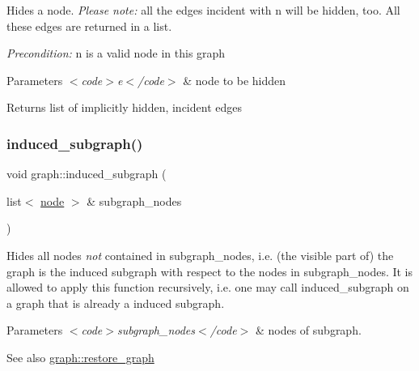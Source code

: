 Hides a node. {\itshape Please note\+:} all the edges incident with {\ttfamily n} will be hidden, too. All these edges are returned in a list.

{\itshape Precondition\+:} {\ttfamily n} is a valid node in this graph


\begin{DoxyParams}{Parameters}
{\em $<$code$>$e$<$/code$>$} & node to be hidden \\
\hline
\end{DoxyParams}
\begin{DoxyReturn}{Returns}
list of implicitly hidden, incident edges 
\end{DoxyReturn}
\mbox{\label{classgraph_ad185dbb16a66777632eb13eec3c54244}} 
\subsubsection{\texorpdfstring{induced\+\_\+subgraph()}{induced\_subgraph()}}
{\footnotesize\ttfamily void graph\+::induced\+\_\+subgraph (\begin{DoxyParamCaption}\item[{list$<$ \mbox{\hyperlink{classnode}{node}} $>$ \&}]{subgraph\+\_\+nodes }\end{DoxyParamCaption})}

Hides all nodes {\itshape not} contained in {\ttfamily subgraph\+\_\+nodes}, i.\+e. (the visible part of) the graph is the induced subgraph with respect to the nodes in {\ttfamily subgraph\+\_\+nodes}. It is allowed to apply this function recursively, i.\+e. one may call {\ttfamily induced\+\_\+subgraph} on a graph that is already a induced subgraph.


\begin{DoxyParams}{Parameters}
{\em $<$code$>$subgraph\+\_\+nodes$<$/code$>$} & nodes of subgraph. \\
\hline
\end{DoxyParams}
\begin{DoxySeeAlso}{See also}
\mbox{\hyperlink{classgraph_a53e2a5505fa6427587e12d66e4a86cec}{graph\+::restore\+\_\+graph}} 
\end{DoxySeeAlso}
\mbox{\label{classgraph_a14c2481f74ba9222732accddf01861bc}} 
